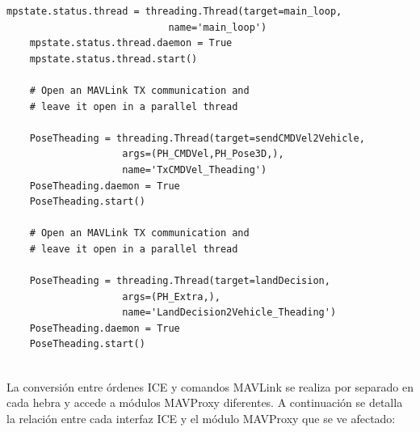 \begin{lstlisting}[frame=single]
    mpstate.status.thread = threading.Thread(target=main_loop, 
    						name='main_loop')
    mpstate.status.thread.daemon = True
    mpstate.status.thread.start()

    # Open an MAVLink TX communication and 
    # leave it open in a parallel thread
  
    PoseTheading = threading.Thread(target=sendCMDVel2Vehicle, 
    				args=(PH_CMDVel,PH_Pose3D,), 
                    name='TxCMDVel_Theading')
    PoseTheading.daemon = True
    PoseTheading.start()

    # Open an MAVLink TX communication and 
    # leave it open in a parallel thread

    PoseTheading = threading.Thread(target=landDecision, 
    				args=(PH_Extra,), 
                    name='LandDecision2Vehicle_Theading')
    PoseTheading.daemon = True
    PoseTheading.start()
   
\end{lstlisting}

La conversión entre órdenes ICE y comandos MAVLink se realiza por separado en cada hebra y accede a módulos MAVProxy diferentes. A continuación se detalla la relación entre cada interfaz ICE y el módulo MAVProxy que se ve afectado:


